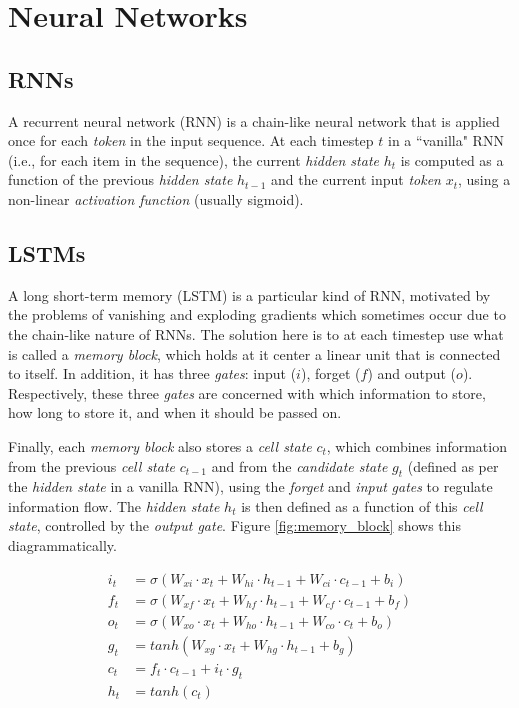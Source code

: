 \section{Neural Networks}

\subsection{RNNs}

A recurrent neural network (RNN) is a chain-like neural network that is applied once for each \textit{token} in the input sequence. At each timestep $t$ in a ``vanilla" RNN (i.e., for each item in the sequence), the current \textit{hidden state} $h_t$ is computed as a function of the previous \textit{hidden state} $h_{t-1}$ and the current input \textit{token} $x_t$, using a non-linear \textit{activation function} (usually sigmoid). \cite{cho_learning_2014}

\subsection{LSTMs}

A long short-term memory (LSTM) is a particular kind of RNN, motivated by the problems of vanishing and exploding gradients which sometimes occur due to the chain-like nature of RNNs. The solution here is to at each timestep use what is called a \textit{memory block}, which holds at it center a linear unit that is connected to itself. In addition, it has three \textit{gates}: input ($i$), forget ($f$) and output ($o$). Respectively, these three \textit{gates} are concerned with which information to store, how long to store it, and when it should be passed on. \cite{gers_learning_2000}

Finally, each \textit{memory block} also stores a \textit{cell state} $c_t$, which combines information from the previous \textit{cell state} $c_{t-1}$ and from the \textit{candidate state} $g_t$ (defined as per the \textit{hidden state} in a vanilla RNN), using the \textit{forget} and \textit{input} \textit{gates} to regulate information flow. The \textit{hidden state} $h_t$ is then defined as a function of this \textit{cell state}, controlled by the \textit{output gate}. Figure \ref{fig:memory_block} shows this diagrammatically. \cite{graves_hybrid_2013}

\begin{equation}
\begin{aligned}
i_t &= \sigma(W_{xi} \cdot x_t + W_{hi} \cdot h_{t-1} + W_{ci} \cdot c_{t-1} + b_i) \\
f_t &= \sigma(W_{xf} \cdot x_t + W_{hf} \cdot h_{t-1} + W_{cf} \cdot c_{t-1} + b_f) \\
o_t &= \sigma(W_{xo} \cdot x_t + W_{ho} \cdot h_{t-1} + W_{co} \cdot c_t + b_o) \\
g_t &= tanh(W_{xg} \cdot x_t + W_{hg} \cdot h_{t-1} + b_g) \\
c_t &= f_t \cdot c_{t-1} + i_t \cdot g_t \\
h_t &= tanh(c_t)
\end{aligned}
\end{equation}

